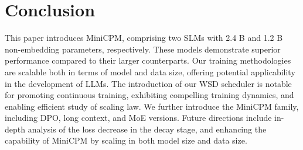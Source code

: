 \documentclass[dvipsnames]{article}
\begin{document}
\begin{table}[htbp]
    \centering
{}
    \caption{Benchmark results of MiniCPM-MoE. $^\dag$ means evaluation results on the full set of MBPP, instead of the hand-verified set~\citep{austin2021program}. The evaluation results of Llama2-34B and Qwen1.5-7B are taken from their technical reports.}
    \label{tab:a4_moe_benchmark}

\end{table}

\vspace{-3mm}
\section{Conclusion}

This paper introduces MiniCPM, comprising two SLMs with 2.4 B and 1.2 B non-embedding parameters, respectively. These models demonstrate superior performance compared to their larger counterparts. Our training methodologies are scalable both in terms of model and data size, offering potential applicability in the development of LLMs. The introduction of our WSD scheduler is notable for promoting continuous training,  exhibiting compelling training dynamics, and enabling efficient study of scaling law. We further introduce the MiniCPM family, including DPO, long context, and MoE versions. Future directions include in-depth analysis of the loss decrease in the decay stage, and enhancing the capability of MiniCPM by scaling in both model size and data size.
\end{document}
